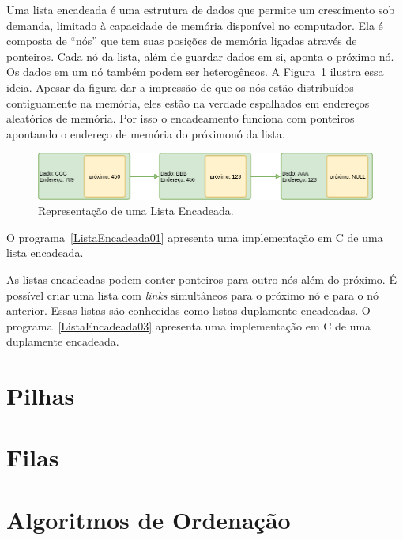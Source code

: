 \documentclass[11pt,fleqn]{book} %
\begin{document}
Uma lista encadeada é uma estrutura de dados que permite um crescimento sob demanda, limitado à capacidade de memória disponível no computador.
Ela é composta de ``nós'' que tem suas posições de memória ligadas através de ponteiros. 
Cada nó da lista, além de guardar dados em si, aponta o próximo nó.
Os dados em um nó também podem ser heterogêneos.
A Figura~\ref{listaEncadeada} ilustra essa ideia. 
Apesar da figura dar a impressão de que os nós estão distribuídos contiguamente na memória, eles estão na verdade espalhados em endereços aleatórios de memória. 
Por isso o encadeamento funciona com ponteiros apontando o endereço de memória do próximonó da lista.
\begin{figure}
	\centering
	\includegraphics[width=.7\textwidth]{Pictures/ListaEncadeada01.png}
	\caption[Lista Encadeada]{Representação de uma Lista Encadeada.}
	\label{listaEncadeada}
\end{figure}
O  programa~\ref{ListaEncadeada01} apresenta uma implementação em C de uma lista encadeada.
\newpage
\label{ListaEncadeada01}

\newpage
As listas encadeadas podem conter ponteiros para outro nós além do próximo. 
É possível criar uma lista com \textit{links} simultâneos para o próximo nó e para o nó anterior.
Essas listas são conhecidas como listas duplamente encadeadas.
O  programa~\ref{ListaEncadeada03} apresenta uma implementação em C de uma duplamente encadeada.

\label{ListaEncadeada03}



\section{Pilhas}\label{pilhas}

\section{Filas}\label{filas}


\section{Algoritmos de Ordenação}\label{ordenacao}
\end{document}
